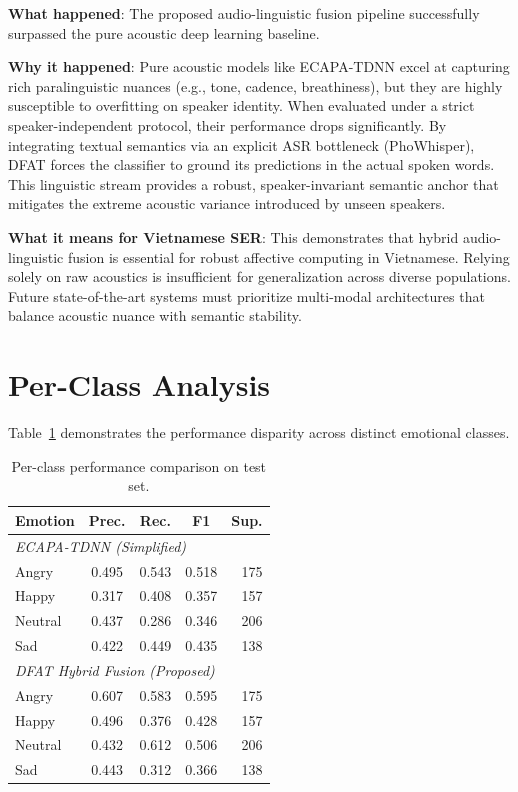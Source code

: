 \documentclass[12pt,a4paper]{report}
\begin{document}
\textbf{What happened}: The proposed audio-linguistic fusion pipeline successfully surpassed the pure acoustic deep learning baseline. 

\textbf{Why it happened}: Pure acoustic models like ECAPA-TDNN excel at capturing rich paralinguistic nuances (e.g., tone, cadence, breathiness), but they are highly susceptible to overfitting on speaker identity. When evaluated under a strict speaker-independent protocol, their performance drops significantly. By integrating textual semantics via an explicit ASR bottleneck (PhoWhisper), DFAT forces the classifier to ground its predictions in the actual spoken words. This linguistic stream provides a robust, speaker-invariant semantic anchor that mitigates the extreme acoustic variance introduced by unseen speakers.

\textbf{What it means for Vietnamese SER}: This demonstrates that hybrid audio-linguistic fusion is essential for robust affective computing in Vietnamese. Relying solely on raw acoustics is insufficient for generalization across diverse populations. Future state-of-the-art systems must prioritize multi-modal architectures that balance acoustic nuance with semantic stability.

\section{Per-Class Analysis}
Table~\ref{tab:perclass} demonstrates the performance disparity across distinct emotional classes.

\begin{table}[h]
\centering
\begin{tabular}{lcccr}
\toprule
\textbf{Emotion} & \textbf{Prec.} & \textbf{Rec.} & \textbf{F1} & \textbf{Sup.} \\
\midrule
\multicolumn{5}{l}{\textit{ECAPA-TDNN (Simplified)}} \\
Angry   & 0.495 & 0.543 & 0.518 & 175 \\
Happy   & 0.317 & 0.408 & 0.357 & 157 \\
Neutral & 0.437 & 0.286 & 0.346 & 206 \\
Sad     & 0.422 & 0.449 & 0.435 & 138 \\
\midrule
\multicolumn{5}{l}{\textit{DFAT Hybrid Fusion (Proposed)}} \\
Angry   & 0.607 & 0.583 & 0.595 & 175 \\
Happy   & 0.496 & 0.376 & 0.428 & 157 \\
Neutral & 0.432 & 0.612 & 0.506 & 206 \\
Sad     & 0.443 & 0.312 & 0.366 & 138 \\
\bottomrule
\end{tabular}
\caption{Per-class performance comparison on test set.}
\label{tab:perclass}
\end{table}
\end{document}
